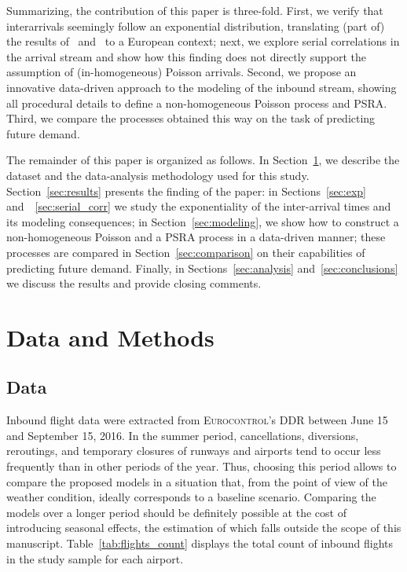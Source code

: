 \documentclass[draft,review]{elsarticle}
\begin{document}
Summarizing, the contribution of this paper is three-fold.
First, we verify that interarrivals seemingly follow an exponential distribution, translating (part of) the results of~\cite{willemain2004statistical} and~\citep{gwiggner2014data} to a European context; next, we explore serial correlations in the arrival stream and show how this finding does not directly support the assumption of (in-homogeneous) Poisson arrivals. Second, we propose an innovative data-driven approach to the modeling of the inbound stream, showing all procedural details to define a non-homogeneous Poisson process and \ac{PSRA}. Third, we compare the processes obtained this way on the task of predicting future demand.

The remainder of this paper is organized as follows.
In Section~\ref{sec:data_methods}, we describe the dataset and the data-analysis methodology used for this study.
Section~\ref{sec:results} presents the finding of the paper:
in Sections~\ref{sec:exp} and~~\ref{sec:serial_corr} we study the exponentiality of the inter-arrival times and its modeling consequences; in Section~\ref{sec:modeling}, we show how to construct a non-homogeneous Poisson and a \ac{PSRA} process in a data-driven manner; these processes are compared in Section~\ref{sec:comparison} on their capabilities of predicting future demand.
Finally, in Sections~\ref{sec:analysis} and~\ref{sec:conclusions} we discuss the results and provide closing comments.

\section{Data and Methods}\label{sec:data_methods}

\subsection{Data}\label{sec:dm_data}

Inbound flight data were extracted from \textsc{Eurocontrol}'s \ac{DDR} between June 15 and September 15, 2016.
In the summer period, cancellations, diversions, reroutings, and temporary closures of runways and airports tend to occur less frequently than in other periods of the year. Thus, choosing this period allows to compare the proposed models in a situation that, from the point of view of the weather condition, ideally corresponds to a baseline scenario.
Comparing the models over a longer period should be definitely possible at the cost of introducing seasonal effects, the estimation of which falls outside the scope of this manuscript.
Table~\ref{tab:flights_count} displays the total count of inbound flights in the study sample for each airport.
\end{document}
